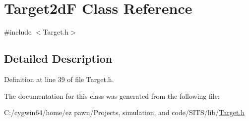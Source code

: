 \hypertarget{class_target2d_f}{}\section{Target2dF Class Reference}
\label{class_target2d_f}


{\ttfamily \#include $<$Target.\+h$>$}



\subsection{Detailed Description}


Definition at line 39 of file Target.\+h.



The documentation for this class was generated from the following file\+:\begin{DoxyCompactItemize}
\item 
C\+:/cygwin64/home/ez pawn/\+Projects, simulation, and code/\+S\+I\+T\+S/lib/\hyperlink{_target_8h}{Target.\+h}\end{DoxyCompactItemize}
